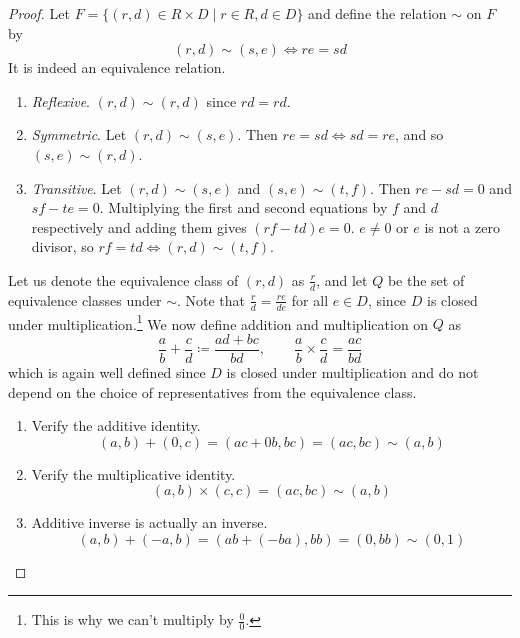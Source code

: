   \begin{proof}
    Let $F = \{(r, d) \in R \times D \mid r \in R, d \in D \}$ and define the relation $\sim$ on $F$ by 
    \begin{equation}
      (r, d) \sim (s, e) \iff re = sd
    \end{equation}
    It is indeed an equivalence relation. 
    \begin{enumerate}
      \item \textit{Reflexive}. $(r, d) \sim (r, d)$ since $rd = rd$. 
      \item \textit{Symmetric}. Let $(r, d) \sim (s, e)$. Then $re = sd \iff sd = re$, and so $(s, e) \sim (r, d)$. 
      \item \textit{Transitive}. Let $(r, d) \sim (s, e)$ and $(s, e) \sim (t, f)$. Then $re - sd = 0$ and $sf - te = 0$. Multiplying the first and second equations by $f$ and $d$ respectively and adding them gives $(rf - td) e = 0$. $e \neq 0$ or $e$ is not a zero divisor, so $rf = td \iff (r, d) \sim (t, f)$. 
    \end{enumerate}
    Let us denote the equivalence class of $(r, d)$ as $\frac{r}{d}$, and let $Q$ be the set of equivalence classes under $\sim$. Note that $\frac{r}{d} = \frac{re}{de}$ for all $e \in D$, since $D$ is closed under multiplication.\footnote{This is why we can't multiply by $\frac{0}{0}$.} We now define addition and multiplication on $Q$ as 
    \begin{equation}
      \frac{a}{b} + \frac{c}{d} \coloneqq \frac{ad + bc}{bd}, \qquad \frac{a}{b} \times \frac{c}{d} = \frac{ac}{bd}
    \end{equation}
    which is again well defined since $D$ is closed under multiplication and do not depend on the choice of representatives from the equivalence class. 
    \begin{enumerate}
      \item Verify the additive identity. 
      \begin{equation}
        (a, b) + (0, c) = (ac + 0b, bc) = (ac, bc) \sim (a, b)
      \end{equation}
      \item Verify the multiplicative identity. 
      \begin{equation}
        (a, b) \times (c, c) = (ac, bc) \sim (a, b)
      \end{equation}
      \item Additive inverse is actually an inverse. 
      \begin{equation}
        (a, b) + (-a, b) = (ab + (-ba), bb) = (0, bb) \sim (0, 1)

\end{equation}
\end{enumerate}
\end{proof}
